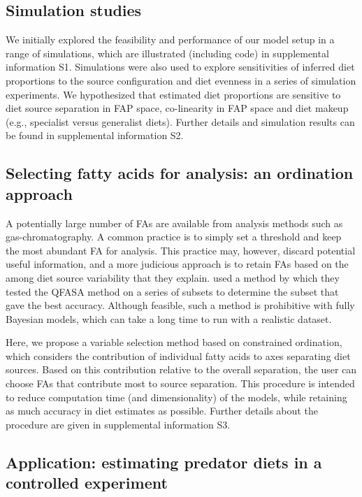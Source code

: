 \documentclass{article}%
\begin{document}
\begin{spacing}{1.9}
\begin{flushleft}
\subsection{Simulation studies}

We initially explored the feasibility and performance of our model setup in a
range of simulations, which are illustrated (including code) in supplemental information S1. Simulations were also used to explore sensitivities of inferred diet proportions to the source
configuration and diet evenness in a series of
simulation experiments. We hypothesized that estimated diet
proportions are sensitive to diet source separation in FAP space,
co-linearity in FAP space \citep{blanchard_inference_2011} and diet makeup (e.g., specialist versus 
generalist diets). Further details and simulation results can be found
in supplemental information S2.

\subsection{Selecting fatty acids for analysis: an ordination approach}

A potentially large number of FAs are available from analysis methods
such as gas-chromatography. A common practice is to simply set a
threshold and keep the most abundant FA for analysis. This practice
may, however, discard potential useful information, and a more
judicious approach is to retain FAs based on the among diet source
variability that they explain. \citet{wang_validating_2010} used a
method by which they tested the QFASA method on a series of subsets to
determine the subset that gave the best accuracy. Although feasible, such
a method is prohibitive with fully Bayesian models, which can take a long
time to run with a realistic dataset.

Here, we propose a variable selection method based on constrained
ordination, which considers the contribution of individual fatty
acids to axes separating diet sources. Based on this contribution
relative to the overall separation, the user can choose FAs
that contribute most to source separation. This procedure is intended
to reduce computation time (and dimensionality) of the models,
while retaining as much accuracy in diet estimates as possible. Further details about the
procedure are given in supplemental information S3.


\subsection{Application: estimating predator diets in a controlled
  experiment}


\end{flushleft}
\end{spacing}
\end{document}
